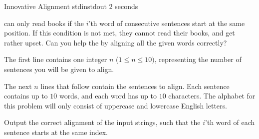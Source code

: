 \begin{problem}{Innovative Alignment}
{stdin}{stdout}
{2 seconds}{}{}

\Stringers can only read books if the $i$'th word of consecutive sentences start at the same position. If this condition is not met, they cannot read their books, and get rather upset. Can you help the \Stringers by aligning all the given words correctly?

\InputFile

The first line contains one integer $n$ ($1 \leq n \leq 10)$, representing the number of sentences you will be given to align. 

The next $n$ lines that follow contain the sentences to align. Each sentence contains up to $10$ words, and each word has up to $10$ characters. The alphabet for this problem will only consist of uppercase and lowercase English letters.
\OutputFile

Output the correct alignment of the input strings, such that the $i$'th word of each sentence starts at the same index. 

\Examples

\begin{example}
%
\end{example}

\begin{example}
%
\end{example}



\end{problem}